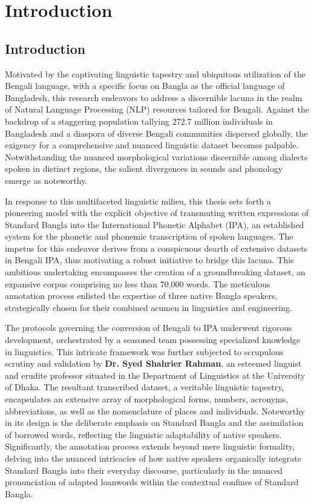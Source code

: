\chapter{Introduction}

\section{Introduction}

Motivated by the captivating linguistic tapestry and ubiquitous utilization of the Bengali language, with a specific focus on Bangla as the official language of Bangladesh, this research endeavors to address a discernible lacuna in the realm of Natural Language Processing (NLP) resources tailored for Bengali. Against the backdrop of a staggering population tallying 272.7 million individuals in Bangladesh and a diaspora of diverse Bengali communities dispersed globally, the exigency for a comprehensive and nuanced linguistic dataset becomes palpable. Notwithstanding the nuanced morphological variations discernible among dialects spoken in distinct regions, the salient divergences in sounds and phonology emerge as noteworthy.

\vspace{5mm}

In response to this multifaceted linguistic milieu, this thesis sets forth a pioneering model with the explicit objective of transmuting written expressions of Standard Bangla into the International Phonetic Alphabet (IPA), an established system for the phonetic and phonemic transcription of spoken languages. The impetus for this endeavor derives from a conspicuous dearth of extensive datasets in Bengali IPA, thus motivating a robust initiative to bridge this lacuna. This ambitious undertaking encompasses the creation of a groundbreaking dataset, an expansive corpus comprising no less than 70,000 words. The meticulous annotation process enlisted the expertise of three native Bangla speakers, strategically chosen for their combined acumen in linguistics and engineering.

\vspace{5mm}

The protocols governing the conversion of Bengali to IPA underwent rigorous development, orchestrated by a seasoned team possessing specialized knowledge in linguistics. This intricate framework was further subjected to scrupulous scrutiny and validation by \textbf{Dr. Syed Shahrier Rahman}, an esteemed linguist and erudite professor situated in the Department of Linguistics at the University of Dhaka. The resultant transcribed dataset, a veritable linguistic tapestry, encapsulates an extensive array of morphological forms, numbers, acronyms, abbreviations, as well as the nomenclature of places and individuals. Noteworthy in its design is the deliberate emphasis on Standard Bangla and the assimilation of borrowed words, reflecting the linguistic adaptability of native speakers. Significantly, the annotation process extends beyond mere linguistic formality, delving into the nuanced intricacies of how native speakers organically integrate Standard Bangla into their everyday discourse, particularly in the nuanced pronunciation of adapted loanwords within the contextual confines of Standard Bangla.

